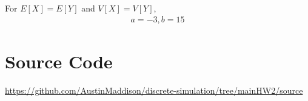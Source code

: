 \documentclass[twocolumn]{article}
\newcommand{\docname}{HW2}
\begin{document}
\vspace{-10pt}
For $E[X]=E[Y]$ and $V[X]=V[Y]$,
\vspace{-10pt}
\begin{align*}
a=-3, b=15
\end{align*}


\section*{Source Code}
\href{https://github.com/AustinMaddison/discrete-simulation/tree/main/hw1/source}{https://github.com/AustinMaddison/discrete-simulation/tree/main\docname/source}

%
%
\end{document}
